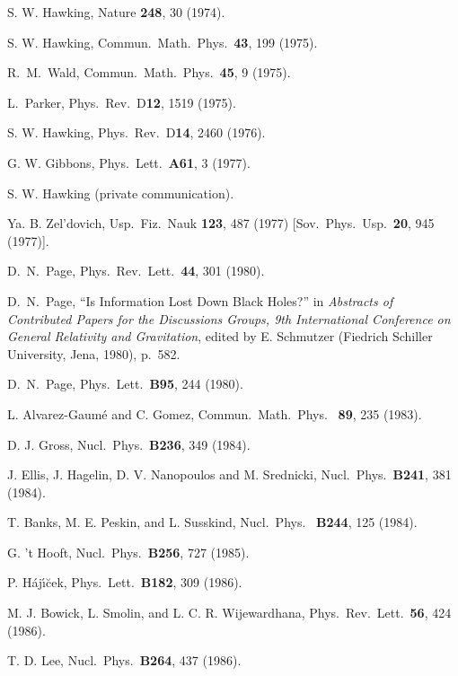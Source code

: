 \documentclass[12pt]{article}
\begin{document}
\baselineskip 13.5pt
	\begin{thebibliography}{999}

 S. W. Hawking, Nature {\bf 248}, 30 (1974).

 S. W. Hawking, Commun.\ Math.\ Phys.\ {\bf 43}, 199
(1975).

 R.\ M.\ Wald, Commun.\ Math.\ Phys.\ {\bf 45}, 9
(1975).

 L.\ Parker, Phys.\ Rev.\ D{\bf12}, 1519 (1975).

 S. W. Hawking,  Phys.\ Rev.\ D{\bf14}, 2460 (1976).

 G. W. Gibbons, Phys.\ Lett.\ {\bf A61}, 3 (1977).

 S. W. Hawking (private communication).

 Ya. B. Zel'dovich, Usp.\ Fiz.\ Nauk {\bf 123}, 487
(1977)
[Sov.\ Phys.\ Usp.\ {\bf 20}, 945 (1977)].

 D.\ N.\ Page, Phys.\ Rev.\ Lett.\ {\bf 44}, 301
(1980).

 D.\ N.\ Page, ``Is Information Lost Down Black
Holes?'' in
{\em
Abstracts of Contributed Papers for the Discussions Groups, 9th
International
Conference on General Relativity and Gravitation}, edited by E.
Schmutzer
(Fiedrich Schiller University, Jena, 1980), p.~582.

 D.\ N.\ Page, Phys.\ Lett.\ {\bf B95}, 244 (1980).

 L. Alvarez-Gaum\'{e} and C. Gomez, Commun.\ Math.\
Phys.\ {\bf
89}, 235 (1983).

 D. J. Gross, Nucl.\ Phys.\ {\bf B236}, 349 (1984).

 J. Ellis, J. Hagelin, D. V. Nanopoulos and M.
Srednicki,
Nucl.\
Phys.\ {\bf B241}, 381 (1984).

 T. Banks, M. E. Peskin, and L. Susskind, Nucl.\ Phys.\
{\bf
B244}, 125 (1984).

 G. 't Hooft, Nucl.\ Phys.\ {\bf B256}, 727 (1985).

 P. H\'{a}j\'{\i}\u{c}ek, Phys.\ Lett.\ {\bf B182},
309 (1986).

\bibitem{BSW} M. J. Bowick, L. Smolin, and L. C. R. Wijewardhana,
Phys.\ Rev.\ Lett.\ {\bf 56}, 424 (1986).

\bibitem{Lee86} T. D. Lee, Nucl.\ Phys.\ {\bf B264}, 437 (1986).


\end{thebibliography}
\end{document}
